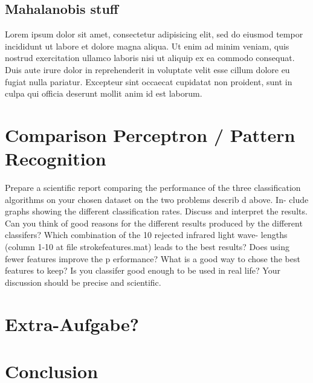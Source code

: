 \documentclass{article}
\begin{document}
\subsection{Mahalanobis stuff}

Lorem ipsum dolor sit amet, consectetur adipisicing elit, sed do eiusmod tempor
incididunt ut labore et dolore magna aliqua. Ut enim ad minim veniam, quis
nostrud exercitation ullamco laboris nisi ut aliquip ex ea commodo consequat.
Duis aute irure dolor in reprehenderit in voluptate velit esse cillum dolore eu
fugiat nulla pariatur. Excepteur sint occaecat cupidatat non proident, sunt in
culpa qui officia deserunt mollit anim id est laborum.

\section{Comparison Perceptron / Pattern Recognition}

Prepare a scientific report comparing the performance of the three classification
algorithms on your chosen dataset on the two problems describ d above. In-
clude graphs showing the different classification rates. Discuss and interpret the
results. Can you think of good reasons for the different results produced by the
different classifers? Which combination of the 10 rejected infrared light wave-
lengths (column 1-10 at file strokefeatures.mat) leads to the best results?
Does using fewer features improve the p erformance? What is a good way to
chose the best features to keep? Is you classifer good enough to be used in real
life? Your discussion should be precise and scientific. 

\section{Extra-Aufgabe?}

\section{Conclusion}
\end{document}

